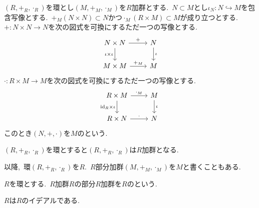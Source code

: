 \begin{definition} \label{def: Submodule}
$(R, +_R, \cdot_R)$を環とし$(M, +_M, \cdot_M)$を$R$加群とする.\
$N \subset M$とし$\iota_N \colon N \hookrightarrow M$を包含写像とする.\
$+_M(N \times N) \subset N$かつ$\cdot_M(R \times M) \subset M$が成り立つとする.\
$+ \colon N \times N \to N$を次の図式を可換にするただ一つの写像とする.
\[\begin{tikzcd}
	{N \times N} & N \\
	{M \times M} & M
	\arrow["{+}", from=1-1, to=1-2]
	\arrow["{\iota \times \iota}"', from=1-1, to=2-1]
	\arrow["\iota", from=1-2, to=2-2]
	\arrow["{+_M}", from=2-1, to=2-2]
\end{tikzcd}\]
$\cdot \colon R \times M \to M$を次の図式を可換にするただ一つの写像とする.
\[\begin{tikzcd}
	{R \times M} & M \\
	{R \times N} & N
	\arrow["{\cdot_M}", from=1-1, to=1-2]
	\arrow["{\mathrm{id}_R \times \iota}"', from=1-1, to=2-1]
	\arrow["\iota", from=1-2, to=2-2]
	\arrow["\cdot", from=2-1, to=2-2]
\end{tikzcd}\]
このとき$(N, +, \cdot)$を$M$のという.
\end{definition}

\begin{example} \label{ex: ring_is_module}
$(R, +_R, \cdot_R)$を環とすると$(R, +_R, \cdot_R)$は$R$加群となる.
\end{example}

\begin{remark} \label{rem: abbreviated_notation}
以降,\ 環$(R, +_R, \cdot_R)$を$R$.\
$R$部分加群$(M, +_M, \cdot_M)$を$M$と書くこともある.
\end{remark}

\begin{definition} \label{def: Ideal}
$R$を環とする.\
$R$加群$R$の部分$R$加群を$R$のという.
\end{definition}

\begin{example} \label{ex: ring_is_ideal}
$R$は$R$のイデアルである.
\end{example}

